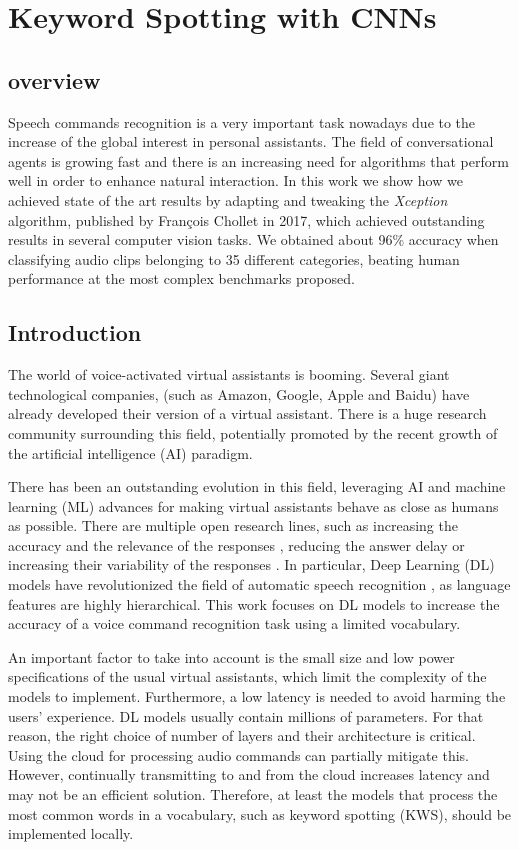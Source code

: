 \chapter{Keyword Spotting with CNNs} \label{ch:kws}

\section{overview}
Speech commands recognition is a very important task nowadays due to the increase of the global interest in personal assistants. The field of conversational agents is growing fast and there is an increasing need for algorithms that perform well in order to enhance natural interaction. In this work we show how we achieved state of the art results by adapting and tweaking the \textit{Xception} algorithm, published by François Chollet in 2017, which achieved outstanding results in several computer vision tasks. We obtained about 96\% accuracy when classifying audio clips belonging to 35 different categories, beating human performance at the most complex benchmarks proposed.


\section{Introduction}
The world of voice-activated virtual assistants is booming. Several giant technological companies, (such as Amazon, Google, Apple and Baidu) have already developed their version of a virtual assistant. There is a huge research community surrounding this field, potentially promoted by the recent growth of the artificial intelligence (AI) paradigm.

There has been an outstanding evolution in this field, leveraging AI and machine learning (ML) advances for  making virtual assistants behave as close as humans as possible. There are multiple open research lines, such as increasing the accuracy and the relevance of the responses \cite{milabot2017}, reducing the answer delay \cite{Han2017} or increasing their variability of the responses \cite{Li2017}. In particular, Deep Learning (DL) models have revolutionized the field of automatic speech recognition \cite{Nassif2019}, as language features are highly hierarchical. This work focuses on DL models to increase the accuracy of a voice command recognition task using a limited vocabulary.

An important factor to take into account is the small size and low power specifications of the usual virtual assistants, which limit the complexity of the models to implement. Furthermore, a low latency is needed to avoid harming the users' experience. DL models usually contain millions of parameters. For that reason, the right choice of number of layers and their architecture is critical. Using the cloud for processing audio commands can partially mitigate this. However, continually transmitting to and from the cloud increases latency and may not be an efficient solution. Therefore, at least the models that process the most common words in a vocabulary, such as keyword spotting (KWS), should be implemented locally.

